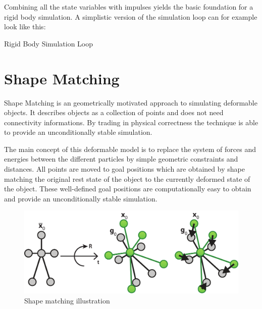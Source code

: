 Combining all the state variables with impulses yields the basic foundation for a rigid body simulation. A simplistic version of the simulation loop can for example look like this:

\begin{algorithm}[htbp]
\caption{Rigid Body Simulation Loop}
\begin{algorithmic}[1]
\ENDFOR
{}
	\ENDFOR
\ENDFOR
{}
\ENDFOR
{}
\ENDFOR
\end{algorithmic}
\end{algorithm}

\section{Shape Matching}
\label{sec:shape_matching}

Shape Matching is an geometrically motivated approach to simulating deformable objects. It describes objects as a collection of points and does not need connectivity informations. By trading in physical correctness the technique is able to provide an unconditionally stable simulation. 

The main concept of this deformable model is to replace the system of forces and energies between the different particles by simple geometric constraints and distances. All points are moved to goal positions which are obtained by shape matching the original rest state of the object to the currently deformed state of the object. These well-defined goal positions are computationally easy to obtain and provide an unconditionally stable simulation.

\begin{figure}[h]
\centering
\includegraphics[width=.96\textwidth]{images/shape_matching.pdf}
\caption{Shape matching illustration}
\label{img:shape_matching}
\end{figure}

